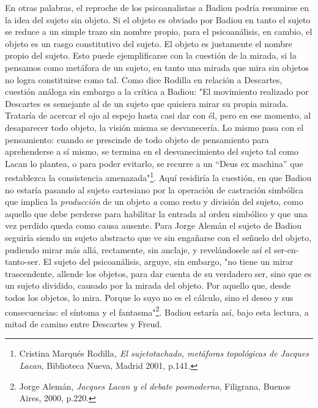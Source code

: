 \documentclass{book}
\begin{document}
En otras palabras, el reproche de los psicoanalistas a Badiou podría
resumirse en la idea del sujeto sin objeto. Si el objeto es obviado por
Badiou en tanto el sujeto se reduce a un simple trazo sin nombre propio,
para el psicoanálisis, en cambio, el objeto es un rasgo constitutivo del
sujeto. El objeto es justamente el nombre propio del sujeto. Esto puede
ejemplificarse con la cuestión de la mirada, si la pensamos como
metáfora de un sujeto, en tanto una mirada que mira sin objetos no logra
constituirse como tal. Como dice Rodilla en relación a Descartes,
cuestión análoga sin embargo a la crítica a Badiou: "El movimiento
realizado por Descartes es semejante al de un sujeto que quisiera mirar
su propia mirada. Trataría de acercar el ojo al espejo hasta casi dar
con él, pero en ese momento, al desaparecer todo objeto, la visión misma
se desvanecería. Lo mismo pasa con el pensamiento: cuando se prescinde
de todo objeto de pensamiento para aprehenderse a sí mismo, se termina
en el desvanecimiento del sujeto tal como Lacan lo plantea, o para poder
evitarlo, se recurre a un ``Deus ex machina'' que restablezca la
consistencia amenazada"\footnote{Cristina Marqués Rodilla\emph{, El
  sujetotachado, metáforas topológicas de Jacques Lacan}, Biblioteca
  Nueva, Madrid 2001, p.141.}. Aquí residiría la cuestión, en que Badiou
no estaría pasando al sujeto cartesiano por la operación de castración
simbólica que implica la \emph{producción} de un objeto \emph{a} como
resto y división del sujeto, como aquello que debe perderse para
habilitar la entrada al orden simbólico y que una vez perdido queda como
causa ausente. Para Jorge Alemán el sujeto de Badiou seguiría siendo un
sujeto abstracto que ve sin engañarse con el señuelo del objeto,
pudiendo mirar más allá, rectamente, sin anclaje, y revelándosele así el
ser-en-tanto-ser. El sujeto del psicoanálisis, arguye, sin embargo, "no
tiene un mirar trascendente, allende los objetos, para dar cuenta de su
verdadero ser, sino que es un sujeto dividido, causado por la mirada del
objeto. Por aquello que, desde todos los objetos, lo mira. Porque lo
suyo no es el cálculo, sino el deseo y sus consecuencias: el síntoma y
el fantasma"\footnote{Jorge Alemán, \emph{Jacques Lacan y el debate
  posmoderno}, Filigrana, Buenos Aires, 2000, p.220.}. Badiou estaría
así, bajo esta lectura, a mitad de camino entre Descartes y Freud.
\end{document}
